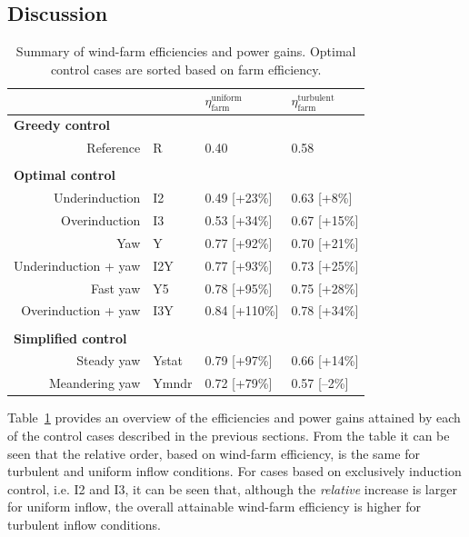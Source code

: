 \documentclass[energies,article,submit,moreauthors,latex,10pt,a4paper]{mdpi}
\begin{document}
\subsection{Discussion}\label{sec:opt_yaw_disc}
\begin{table}
	\caption{Summary of wind-farm efficiencies and power gains. Optimal control cases are sorted based on farm efficiency. \label{tab:yaw_summary}}
	\centering
	\begin{tabular}{rlll}
		\toprule
		&   	 & $\eta_{\text{farm}}^{\text{uniform}}$  & $\eta_{\text{farm}}^{\text{turbulent}}$\\
		\midrule
		\multicolumn{1}{l}{\textbf{Greedy control}} & & & \\
		Reference   		    	& R 	 & 0.40					       & 0.58\\
		\\
		\multicolumn{1}{l}{\textbf{Optimal control}} & & & \\
		Underinduction  			& I2 	 & 0.49	[+23\%]				   & 0.63 [+8\%]\\
		Overinduction 	  			& I3 	 & 0.53	[+34\%]				   & 0.67 [+15\%]\\
		Yaw 			    		& Y 	 & 0.77	[+92\%]				   & 0.70 [+21\%]\\
		Underinduction + yaw 		& I2Y 	 & 0.77  [+93\%] 			   & 0.73 [+25\%]\\
		Fast yaw  					& Y5	 & 0.78 [+95\%]  			   & 0.75 [+28\%]\\
		Overinduction + yaw  		& I3Y 	 & 0.84	[+110\%]			   & 0.78 [+34\%]\\
		\\		
		\multicolumn{1}{l}{\textbf{Simplified control}} & & & \\	
		Steady yaw  				& Ystat  & 0.79 	[+97\%]				   & 0.66 [+14\%]\\		        
		Meandering yaw 				& Ymndr  & 0.72 [+79\%] 			   & 0.57 [--2\%]\\					
		\bottomrule
	\end{tabular}
\end{table}

\noindent Table~\ref{tab:yaw_summary} provides an overview of the efficiencies and power gains attained by each of the control cases described in the previous sections. From the table it can be seen that the relative order, based on wind-farm efficiency, is the same for turbulent and uniform inflow conditions. For cases based on exclusively induction control, i.e. I2 and I3, it can be seen that, although the \emph{relative} increase is larger for uniform inflow, the overall attainable wind-farm efficiency is higher for turbulent inflow conditions. 
\end{document}
